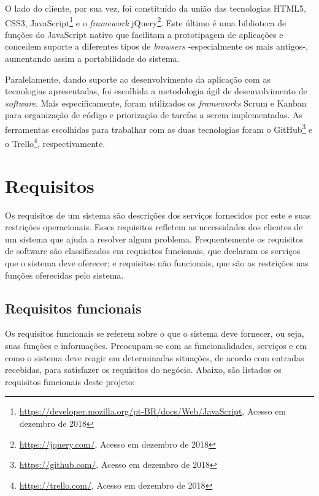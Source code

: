 O lado do cliente, por sua vez, foi constituído da união das tecnologias HTML5, CSS3, JavaScript\footnote{\url{https://developer.mozilla.org/pt-BR/docs/Web/JavaScript}, Acesso em dezembro de 2018} e o \textit{framework} jQuery\footnote{\url{https://jquery.com/}, Acesso em dezembro de 2018}. Este último é uma biblioteca de funções do JavaScript nativo que facilitam a prototipagem de aplicações e concedem suporte a diferentes tipos de \textit{browsers} -especialmente os mais antigos-, aumentando assim a portabilidade do sistema.

Paralelamente, dando suporte ao desenvolvimento da aplicação com as tecnologias apresentadas, foi escolhida a metodologia ágil de desenvolvimento de \textit{software}. Mais especificamente, foram utilizados os \textit{frameworks} Scrum e Kanban para organização de código e priorização de tarefas a serem implementadas. As ferramentas escolhidas para trabalhar com as duas tecnologias foram o GitHub\footnote{\url{https://github.com/}, Acesso em dezembro de 2018} e o Trello\footnote{\url{https://trello.com/}, Acesso em dezembro de 2018}, respectivamente.

\section{Requisitos}
\label{metodologiaRequisitos}
Os requisitos de um sistema são descrições dos serviços fornecidos por este e suas restrições operacionais. Esses requisitos refletem as necessidades dos clientes de um sistema que ajuda a resolver algum problema. Frequentemente os requisitos de software são classificados em requisitos funcionais, que declaram os serviços que o sistema deve oferecer; e requisitos não funcionais, que são as restrições nas funções oferecidas pelo sistema. 

\subsection{Requisitos funcionais}
\label{requisitosRF}
Os requisitos funcionais se referem sobre o que o sistema deve fornecer, ou seja, suas funções e informações. Preocupam-se com as funcionalidades, serviços e em como o sistema deve reagir em determinadas situações, de acordo com entradas recebidas, para satisfazer os requisitos do negócio. Abaixo, são listados os requisitos funcionais deste projeto:  

